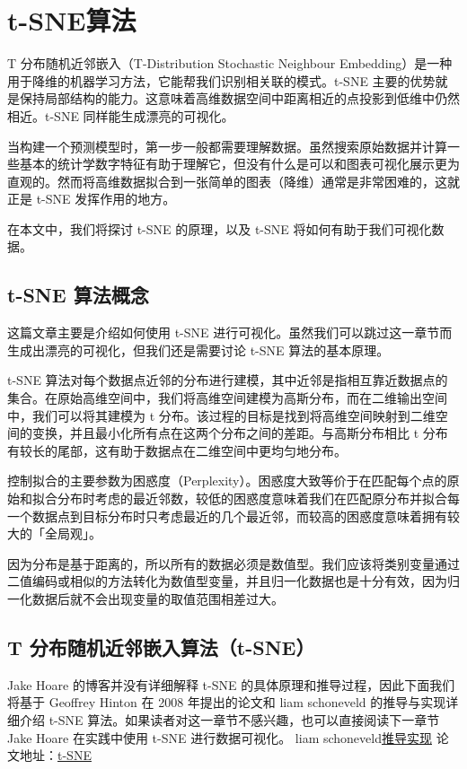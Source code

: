 \section{t-SNE算法}
T 分布随机近邻嵌入（T-Distribution Stochastic Neighbour Embedding）是一种用于降维的机器学习方法，它能帮我们识别相关联的模式。t-SNE 主要的优势就是保持局部结构的能力。这意味着高维数据空间中距离相近的点投影到低维中仍然相近。t-SNE 同样能生成漂亮的可视化。

当构建一个预测模型时，第一步一般都需要理解数据。虽然搜索原始数据并计算一些基本的统计学数字特征有助于理解它，但没有什么是可以和图表可视化展示更为直观的。然而将高维数据拟合到一张简单的图表（降维）通常是非常困难的，这就正是 t-SNE 发挥作用的地方。

在本文中，我们将探讨 t-SNE 的原理，以及 t-SNE 将如何有助于我们可视化数据。
\subsection{t-SNE 算法概念}
这篇文章主要是介绍如何使用 t-SNE 进行可视化。虽然我们可以跳过这一章节而生成出漂亮的可视化，但我们还是需要讨论 t-SNE 算法的基本原理。

t-SNE 算法对每个数据点近邻的分布进行建模，其中近邻是指相互靠近数据点的集合。在原始高维空间中，我们将高维空间建模为高斯分布，而在二维输出空间中，我们可以将其建模为 t 分布。该过程的目标是找到将高维空间映射到二维空间的变换，并且最小化所有点在这两个分布之间的差距。与高斯分布相比 t 分布有较长的尾部，这有助于数据点在二维空间中更均匀地分布。

控制拟合的主要参数为困惑度（Perplexity）。困惑度大致等价于在匹配每个点的原始和拟合分布时考虑的最近邻数，较低的困惑度意味着我们在匹配原分布并拟合每一个数据点到目标分布时只考虑最近的几个最近邻，而较高的困惑度意味着拥有较大的「全局观」。

因为分布是基于距离的，所以所有的数据必须是数值型。我们应该将类别变量通过二值编码或相似的方法转化为数值型变量，并且归一化数据也是十分有效，因为归一化数据后就不会出现变量的取值范围相差过大。
\subsection{T 分布随机近邻嵌入算法（t-SNE）}
Jake Hoare 的博客并没有详细解释 t-SNE 的具体原理和推导过程，因此下面我们将基于 Geoffrey Hinton 在 2008 年提出的论文和 liam schoneveld 的推导与实现详细介绍 t-SNE 算法。如果读者对这一章节不感兴趣，也可以直接阅读下一章节 Jake Hoare 在实践中使用 t-SNE 进行数据可视化。
liam schoneveld\href{https://nlml.github.io/in-raw-numpy/in-raw-numpy-t-sne/}{推导实现}
论文地址：\href{http://www.jmlr.org/papers/volume9/vandermaaten08a/vandermaaten08a.pdf}{t-SNE}

